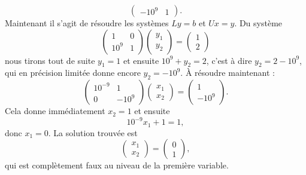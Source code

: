 \begin{example}
\begin{equation}
\begin{pmatrix}
            -10^9    &   1    
        \end{pmatrix}.
    \end{equation}
    Maintenant il s'agit de résoudre les systèmes \( Ly=b\) et \( Ux=y\). Du système
    \begin{equation}
        \begin{pmatrix}
            1    &   0    \\ 
            10^9    &   1    
        \end{pmatrix}\begin{pmatrix}
            y_1    \\ 
            y_2    
        \end{pmatrix}=\begin{pmatrix}
            1    \\ 
            2    
        \end{pmatrix}
    \end{equation}
    nous tirons tout de suite \( y_1=1\) et ensuite \( 10^9+y_2=2\), c'est à dire \( y_2=2-10^9\), qui en précision limitée donne encore \( y_2=-10^9\). À résoudre maintenant :
    \begin{equation}
        \begin{pmatrix}
            10^{-9}    &   1    \\ 
            0    &   -10^9    
        \end{pmatrix}\begin{pmatrix}
            x_1    \\ 
            x_2    
        \end{pmatrix}=\begin{pmatrix}
            1    \\ 
            -10^9    
        \end{pmatrix}.
    \end{equation}
    Cela donne immédiatement \( x_2=1\) et ensuite
    \begin{equation}
        10^{-9}x_1+1=1, 
    \end{equation}
    donc \( x_1=0\). La solution trouvée est
    \begin{equation}        \label{EQooBGWEooVGSVoe}
        \begin{pmatrix}
            x_1    \\ 
            x_2    
        \end{pmatrix}=\begin{pmatrix}
            0    \\ 
            1    
        \end{pmatrix},
    \end{equation}
    qui est complètement faux au niveau de la première variable.
\end{example}

